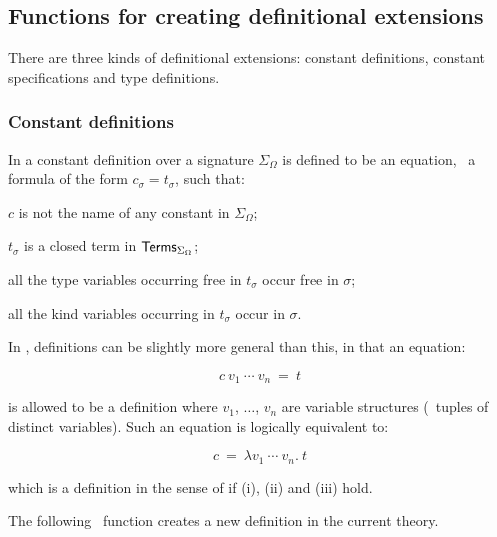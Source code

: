 \subsection{Functions for creating definitional extensions}
\label{avra_definitional}

There are three kinds of definitional extensions:
constant definitions, constant specifications and type definitions.

\subsubsection{Constant definitions}
\label{sec:constant-definitions}

In \LOGIC{} a constant definition
%
%
over a signature $\Sigma_{\Omega}$ is defined to be an equation, \ie\
a formula of the form $c_{\sigma}=t_{\sigma}$, such that:
\begin{myenumerate}
\item $c$ is not the name of any constant in $\Sigma_{\Omega}$;
\item $t_{\sigma}$ is a closed term in ${\sf Terms}_{\Sigma_{\Omega}}$;
\item all the type variables occurring free in $t_{\sigma}$ occur free in $\sigma$;
\item all the kind variables occurring in $t_{\sigma}$ occur in $\sigma$.
\end{myenumerate}

In \HOL, definitions can be slightly more general than this, in that
an equation:

\[ c\ v_1\ \cdots\ v_n\ =\ t \]

\noindent is  allowed  to  be a  definition where  $v_1$, $\dots$, $v_n$ are
variable structures (\ie\ tuples of distinct variables).   Such  an equation is
logically equivalent to:

\[ c\ =\ \lambda v_1\ \cdots\ v_n.\  t \]

\noindent which is a definition in the sense of \LOGIC{} if (i),
(ii) and (iii) hold.

The following  \ML\ function  creates a  new definition in
the current theory.

